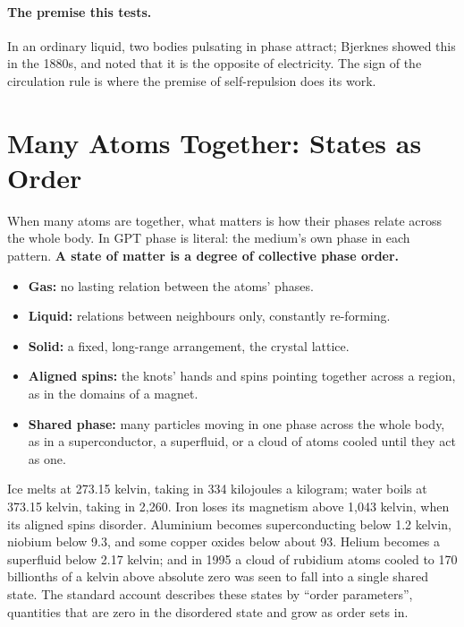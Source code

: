 \documentclass[11pt,a4paper]{article}
\begin{document}
\paragraph{The premise this tests.} In an ordinary liquid, two bodies pulsating in phase attract; Bjerknes showed this in the 1880s, and noted that it is the opposite of electricity.  The sign of the circulation rule is where the premise of self-repulsion does its work.

\section{Many Atoms Together: States as Order}
\label{sec:states}

\begin{hypbar}
When many atoms are together, what matters is how their phases relate across the whole body. In GPT phase is literal: the medium's own phase in each pattern. \textbf{A state of matter is a degree of collective phase order.}
\begin{itemize}
\item \textbf{Gas:} no lasting relation between the atoms' phases.
\item \textbf{Liquid:} relations between neighbours only, constantly re-forming.
\item \textbf{Solid:} a fixed, long-range arrangement, the crystal lattice.
\item \textbf{Aligned spins:} the knots' hands and spins pointing together across a region, as in the domains of a magnet.
\item \textbf{Shared phase:} many particles moving in one phase across the whole body, as in a superconductor, a superfluid, or a cloud of atoms cooled until they act as one.
\end{itemize}
\end{hypbar}

 Ice melts at 273.15 kelvin, taking in 334 kilojoules a kilogram; water boils at 373.15 kelvin, taking in 2,260. Iron loses its magnetism above 1,043 kelvin, when its aligned spins disorder. Aluminium becomes superconducting below 1.2 kelvin, niobium below 9.3, and some copper oxides below about 93. Helium becomes a superfluid below 2.17 kelvin; and in 1995 a cloud of rubidium atoms cooled to 170 billionths of a kelvin above absolute zero was seen to fall into a single shared state. The standard account describes these states by ``order parameters'', quantities that are zero in the disordered state and grow as order sets in. 
\end{document}
